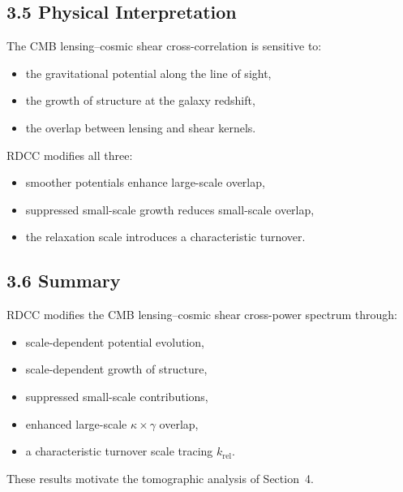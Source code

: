 \documentclass[11pt,a4paper]{article}
\begin{document}
\subsection*{3.5 Physical Interpretation}

The CMB lensing--cosmic shear cross-correlation is sensitive to:

\begin{itemize}
    \item the gravitational potential along the line of sight,
    \item the growth of structure at the galaxy redshift,
    \item the overlap between lensing and shear kernels.
\end{itemize}

RDCC modifies all three:

\begin{itemize}
    \item smoother potentials enhance large-scale overlap,
    \item suppressed small-scale growth reduces small-scale overlap,
    \item the relaxation scale introduces a characteristic turnover.
\end{itemize}

\subsection*{3.6 Summary}

RDCC modifies the CMB lensing--cosmic shear cross-power spectrum through:

\begin{itemize}
    \item scale-dependent potential evolution,
    \item scale-dependent growth of structure,
    \item suppressed small-scale contributions,
    \item enhanced large-scale $\kappa \times \gamma$ overlap,
    \item a characteristic turnover scale tracing $k_{\mathrm{rel}}$.
\end{itemize}

These results motivate the tomographic analysis of Section~4.

\end{document}
